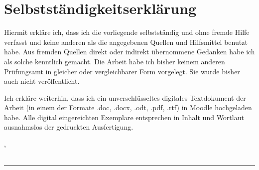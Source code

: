 
\chapter*{Selbstständigkeitserklärung}
\vspace*{2em}


Hiermit erkläre ich, dass ich die vorliegende {\myArbeit} selbstständig und ohne fremde Hilfe verfasst und keine anderen als die angegebenen Quellen und Hilfsmittel benutzt habe. Aus fremden Quellen direkt oder indirekt übernommene Gedanken habe ich als solche kenntlich gemacht. Die Arbeit habe ich bisher keinem anderen Prüfungsamt in gleicher oder vergleichbarer Form vorgelegt. Sie wurde bisher auch nicht veröffentlicht.

Ich erkläre weiterhin, dass ich ein unverschlüsseltes digitales Textdokument der Arbeit (in einem der Formate .doc, .docx, .odt, .pdf, .rtf) in Moodle hochgeladen habe. Alle digital eingereichten Exemplare entsprechen in Inhalt und Wortlaut ausnahmslos der gedruckten Ausfertigung.


\vspace{3em}
\noindent
\myAbgabeort, \myDatum
\\
\\
\noindent
\rule{6cm}{0.4pt}\\
\myAutor
